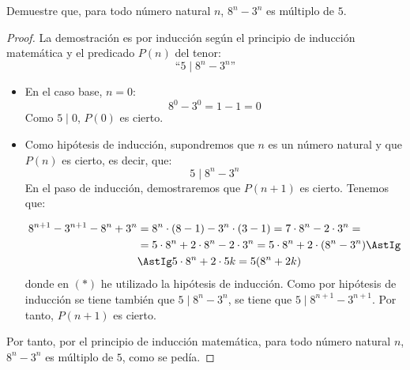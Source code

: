 \begin{ejercicio}
    Demuestre que, para todo número natural $n$, $8^n - 3^n$ es múltiplo de $5$.

    \begin{proof}
        La demostración es por inducción según el principio de inducción matemática y el predicado $P(n)$ del tenor:
        \begin{equation*}
            \text{``}5 \mid 8^n - 3^n\text{''}
        \end{equation*}

        \begin{itemize}
            \item En el caso base, $n=0$:
                \begin{equation*}
                    8^0 - 3^0 = 1-1 = 0
                \end{equation*}
                Como $5\mid 0$, $P(0)$ es cierto.

            \item Como hipótesis de inducción, supondremos que $n$ es un número natural y que $P(n)$ es cierto, es decir, que:
                \begin{equation*}
                    5\mid 8^n - 3^n
                \end{equation*}
                En el paso de inducción, demostraremos que $P(n+1)$ es cierto. Tenemos que:
                
                \begin{align*}
                    8^{n+1}-3^{n+1} - 8^n + 3^n &= 8^n\cdot (8-1) -3^n\cdot (3-1) = 7\cdot 8^n - 2\cdot 3^n =\\
                    &= 5\cdot 8^n + 2\cdot 8^n - 2\cdot 3^n = 5\cdot 8^n + 2\cdot (8^n - 3^n) \AstIg\\
                    &\AstIg 5\cdot 8^n + 2\cdot 5k = 5(8^n + 2k)
                \end{align*}
                donde en $(\ast)$ he utilizado la hipótesis de inducción.
                Como por hipótesis de inducción se tiene también que $5\mid 8^n - 3^n$, se tiene que $5\mid 8^{n+1} - 3^{n+1}$.
                Por tanto, $P(n+1)$ es cierto.
        \end{itemize}
        Por tanto, por el principio de inducción matemática, para todo número natural $n$, $8^n - 3^n$ es múltiplo de $5$, como se pedía.
    \end{proof}
\end{ejercicio}


